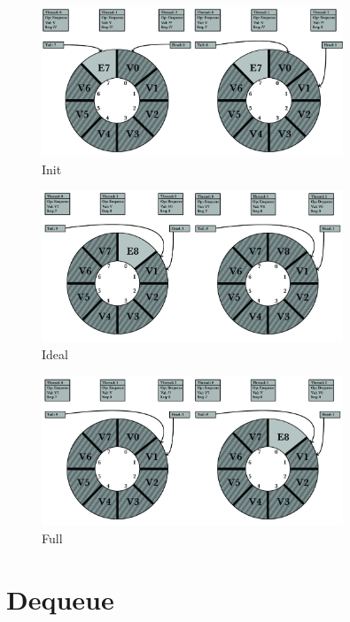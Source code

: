 \begin{figure}[ht!]
\centering
\includegraphics[width=90mm]{figures/buffer_init.jpg}
\caption{Init}
\label{buffer_ex}
\end{figure}

\begin{figure}[ht!]
\centering
\includegraphics[width=90mm]{figures/buffer_ideal.jpg}
\caption{Ideal}
\label{buffer_ex}
\end{figure}

\begin{figure}[ht!]
\centering
\includegraphics[width=90mm]{figures/buffer_full.jpg}
\caption{Full}
\label{buffer_ex}
\end{figure}


\section{Dequeue} %
\label{sec:alg:deq}

\lfdequeue %
\wfdequeue %
\opTryFail
\dequeueassoc %


